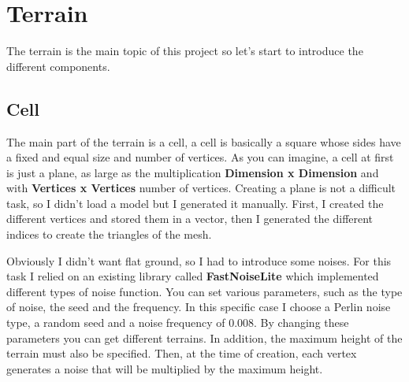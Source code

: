 \section{Terrain}

The terrain is the main topic of this project so let's start to introduce the different components.

\subsection{Cell}
\noindent
The main part of the terrain is a cell, a cell is basically a square whose sides have a fixed and equal size and number of vertices. As you can imagine, a cell at first is just a plane, as large as the multiplication \textbf {Dimension x Dimension} and with \textbf {Vertices x Vertices} number of vertices. Creating a plane is not a difficult task, so I didn't load a model but I generated it manually. First, I created the different vertices and stored them in a vector, then I generated the different indices to create the triangles of the mesh.

\begin{figure}[hbt!]
	\centering
	\qquad
	\caption{}
\end{figure}

\noindent
Obviously I didn't want flat ground, so I had to introduce some noises. For this task I relied on an existing library called \textbf{FastNoiseLite} which implemented different types of noise function. You can set various parameters, such as the type of noise, the seed and the frequency. In this specific case I choose a Perlin noise type, a random seed and a noise frequency of 0.008. By changing these parameters you can get different terrains.
In addition, the maximum height of the terrain must also be specified. Then, at the time of creation, each vertex generates a noise that will be multiplied by the maximum height.

